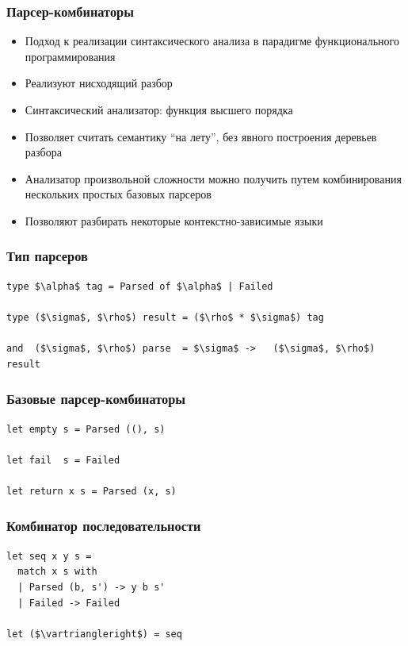 \documentclass{beamer}
\begin{document}
\begin{frame}
  \transwipe[direction=90]
  \frametitle{Парсер-комбинаторы}  
  \begin{itemize}
  \item Подход к реализации синтаксического анализа в парадигме функционального программирования
  \item Реализуют нисходящий разбор
  \item Синтаксический анализатор: функция высшего порядка
  \item Позволяет считать семантику ``на лету'', без явного построения деревьев разбора
  \item Анализатор произвольной сложности можно получить путем комбинирования нескольких простых базовых парсеров
  \item Позволяют разбирать некоторые контекстно-зависимые языки
  \end{itemize}
\end{frame}

\begin{frame}[containsverbatim]
  \transwipe[direction=90]
  \frametitle{Тип парсеров}
  
\begin{lstlisting}[frame=single]  
type $\alpha$ tag = Parsed of $\alpha$ | Failed

type ($\sigma$, $\rho$) result = ($\rho$ * $\sigma$) tag

and  ($\sigma$, $\rho$) parse  = $\sigma$ ->   ($\sigma$, $\rho$) result
\end{lstlisting}
\end{frame}


\begin{frame}[fragile]
  \transwipe[direction=90]
  \frametitle{Базовые парсер-комбинаторы}  
\begin{lstlisting}[frame=single]  
let empty s = Parsed ((), s)

let fail  s = Failed 

let return x s = Parsed (x, s)
\end{lstlisting}
\end{frame}

\begin{frame}[fragile]
  \transwipe[direction=90]
  \frametitle{Комбинатор последовательности}  
\begin{lstlisting}[frame=single]  
let seq x y s =
  match x s with
  | Parsed (b, s') -> y b s'
  | Failed -> Failed

let ($\vartriangleright$) = seq
\end{lstlisting}
\end{frame}
\end{document}
